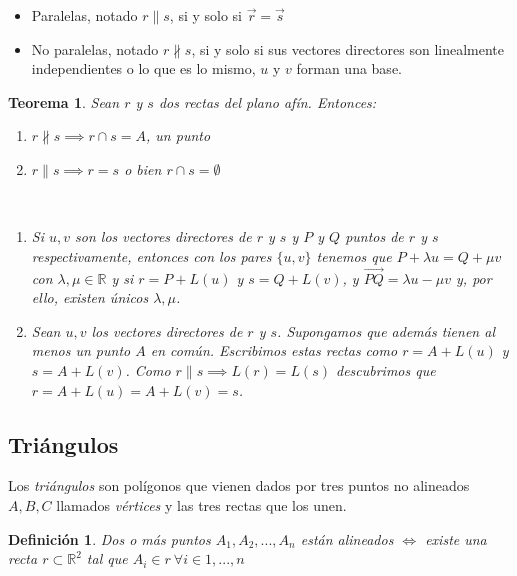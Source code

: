 \documentclass[11pt, a4paper]{article}
\makeatletter
\newif\IfInSansMode
\let\oldsf\sffamily
\renewcommand*{\sffamily}{\oldsf\mathversion{sans}\InSansModetrue}
\let\oldnorm\normalfont
\renewcommand*{\normalfont}{\oldnorm\InSansModefalse\mathversion{normal}}
\renewenvironment{proof}[1][\proofname] {\vspace{-15pt}\par\pushQED{\qed}\normalfont\topsep6\p@\@plus6\p@\relax\trivlist\item[\hskip\labelsep\it#1\@addpunct{.}]\ignorespaces}{\popQED\endtrivlist\@endpefalse}
\newcommand{\R}{\mathbb{R}}
\renewcommand{\vec}{\overrightarrow}
\renewenvironment{proof}[1][\proofname] {\par\pushQED{\qed}\normalfont\topsep6\p@\@plus6\p@\relax\trivlist\item[\hskip\labelsep\itshape\sffamily#1\@addpunct{.}]\ignorespaces}{\popQED\endtrivlist\@endpefalse}
\theoremstyle{theorem-style}
\newtheorem{nth}{Teorema}[section]
\theoremstyle{definition-style}
\newtheorem{ndef}{Definición}[section]
\theoremstyle{remark-style}
\theoremstyle{example-style}
\newenvironment{nlist}
{\begin{enumerate}
    \renewcommand\labelenumi{(\emph{\roman{enumi})}}}
  {\end{enumerate}}
\makeatother
\begin{document}
\begin{itemize}
\item Paralelas, notado $r\parallel s$, si y solo si $\vec{r} = \vec{s}$
\item No paralelas, notado $r\nparallel s$, si y solo si sus vectores directores son linealmente independientes o lo que es lo mismo, $u$ y $v$ forman una base.
\end{itemize}

\begin{nth}
  Sean $r$ y $s$ dos rectas del plano afín. Entonces:
  \begin{nlist}
  \item $r \nparallel s\implies r \cap s = A$, un punto
  \item $r \parallel s \implies r = s$ o bien $r \cap s =  \emptyset$
  \end{nlist}

  \begin{proof}\hfill\\
    \begin{nlist}
    \item Si $u,v$ son los vectores directores de $r$ y $s$ y $P$ y $Q$ puntos de $r$ y $s$ respectivamente, entonces con los pares $\{u,v\}$ tenemos que $P+\lambda u = Q + \mu v$ con $\lambda, \mu \in \R$
      y si $r = P +L(u)$ y $s=Q+L(v)$, y $\overrightarrow{PQ} = \lambda u - \mu v $ y, por ello, existen únicos $\lambda, \mu$.
    \item Sean $u,v$ los vectores directores de $r$ y $s$. Supongamos que además tienen al menos un punto $A$ en común. Escribimos estas rectas como $r = A +L(u)$ y $s=A+L(v)$. Como $r \parallel s \implies L(r)=L(s)$ descubrimos que $r = A +L(u)=A+L(v) = s$.
    \end{nlist}
  \end{proof}
\end{nth}


\subsection{Triángulos}
Los \textit{triángulos} son polígonos que vienen dados por tres puntos no alineados $A, B, C$ llamados \textit{vértices} y las tres rectas que los unen.

\begin {ndef}
  Dos o más puntos $A_1, A_2, ... , A_n $ están alineados $\iff$ existe una recta $r \subset \mathbb{R}^2$ tal que $A_i \in r\ \forall i \in 1,...,n$
\end{ndef}
\end{document}
